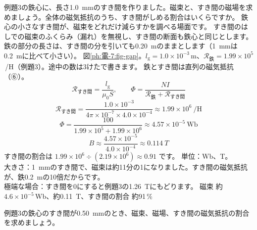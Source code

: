 \label{ph:電-7:ex4}
\begin{phreidai}[すき間のある鉄心]
例題3の鉄心に、長さ\qty{1.0}{mm}のすき間を作りました。磁束と、すき間の磁場を求めましょう。全体の磁気抵抗のうち、すき間がしめる割合はいくらですか。
\phbamen
鉄心の小さなすき間が、磁束をどれだけ減らすかを調べる場面です。
\phmushi
すき間のはしでの磁束のふくらみ（漏れ）を無視し、すき間の断面も鉄心と同じとします。鉄の部分の長さは、すき間の分を引いても\qty{0.20}{m}のままとします（\qty{1}{mm}は\qty{0.2}{m}に比べて小さい）。
\phzu
図\ref{ph:電-7:fig-gap}。$l_{\mathrm g}=1.0\times10^{-3}$\,m、$\mathcal R_{\text{鉄}}=1.99\times10^5$\,/H（例題3）。途中の数は3けたで書きます。
\phriyu
鉄とすき間は直列の磁気抵抗（⑥）。
\phtateru
\[\mathcal R_{\text{すき間}}=\frac{l_{\mathrm g}}{\mu_0S},\qquad\Phi=\frac{NI}{\mathcal R_{\text{鉄}}+\mathcal R_{\text{すき間}}}\]
\phtoku
\[\mathcal R_{\text{すき間}}=\frac{1.0\times10^{-3}}{4\pi\times10^{-7}\times4.0\times10^{-4}}\approx1.99\times10^6\ \text{/H}\]
\[\Phi=\frac{100}{1.99\times10^5+1.99\times10^6}\approx4.57\times10^{-5}\ \text{Wb}\]
\[B\approx\frac{4.57\times10^{-5}}{4.0\times10^{-4}}\approx\qty{0.114}{T}\]
すき間の割合は $1.99\times10^6\div(2.19\times10^6)\approx0.91$ です。
\phtashikame
単位：Wb、T。\\
大きさ：\qty{1}{mm}のすき間で、磁束は約11分の1になりました。すき間の磁気抵抗が、鉄\qty{0.2}{m}の10倍だからです。\\
極端な場合：すき間を0にすると例題3の\qty{1.26}{T}にもどります。
\kotae 磁束 約 $4.6\times10^{-5}$\,Wb、約\qty{0.11}{T}、すき間の割合 約91\,\%
\end{phreidai}
\begin{jibun}
例題3の鉄心のすき間が\qty{0.50}{mm}のとき、磁束、磁場、すき間の磁気抵抗の割合を求めましょう。
\end{jibun}

